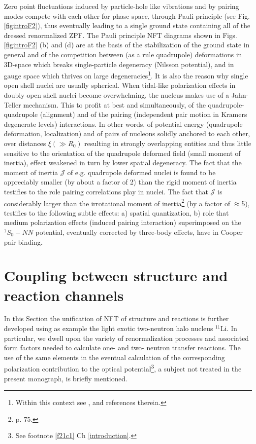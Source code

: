 Zero point fluctuations induced by particle-hole  like vibrations and by pairing modes compete with each other for phase space, through Pauli principle (see Fig. \ref{figintroF2}), thus eventually leading to a single ground state containing all of the dressed renormalized ZPF. The Pauli principle NFT diagrams shown in Figs. \ref{figintroF2} (b) and (d) are at the basis of the stabilization of the ground state in general and of the competition between (as a rule quadrupole) deformations in 3D-space which breaks single-particle degeneracy (Nilsson potential), and in gauge space which thrives on large degeneracies\footnote{Within this context see \cite{Bayman:61,Bes:69,Mottelson:62,Bohr:75}, and references therein.}. It is also the reason why single open shell nuclei are usually spherical. When tidal-like polarization effects in doubly open shell nuclei become overwhelming, the nucleus makes use of a Jahn-Teller mechanism. This to profit at best and simultaneously, of the quadrupole-quadrupole (alignment) and of the pairing (independent pair motion in Kramers degenerate levels) interactions. In other words, of potential energy (quadrupole deformation, localization) and of pairs of nucleons solidly anchored to each other, over distances $\xi (\gg R_0)$ resulting in strongly overlapping entities and thus little sensitive to the orientation of the quadrupole deformed field (small moment of inertia), effect weakened in turn by  lower spatial degeneracy. The fact that the moment of inertia $\mathcal J$ of e.g. quadrupole deformed nuclei is found to be appreciably smaller (by about a factor of 2) than the rigid moment of inertia testifies to the role pairing correlations play in nuclei. The fact that $\mathcal J$ is considerably larger than the irrotational moment of inertia\footnote{\cite{Bohr:75} p. 75.} (by a factor of $\approx$5), testifies to the following subtle effects: a)  spatial quantization, b) role that medium polarization effects (induced pairing interaction) superimposed on the $^1S_0-NN$ potential, eventually corrected by  three-body effects, have in Cooper pair binding.
\clearpage

\section[Coupling between structure and reactions]{Coupling between structure and reaction channels}\label{C1S9}
In this Section the unification of NFT of structure and reactions is further developed using as example the light exotic two-neutron halo nucleus $^{11}$Li. In particular, we dwell upon the variety of renormalization processes and associated form factors needed to calculate one- and two- neutron transfer reactions. The use of the same elements in the eventual calculation of the corresponding polarization contribution to the optical potential\footnote{\label{footnoteOM}See footnote \ref{f21c1} Ch \ref{introduction}.}, a subject not treated in the present monograph, is briefly mentioned.  
